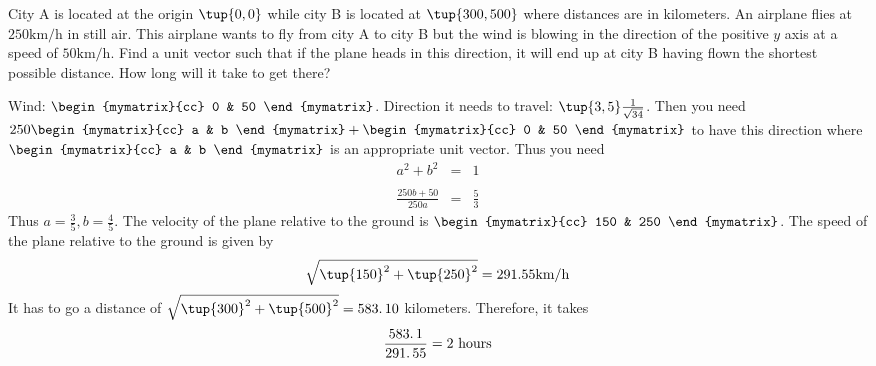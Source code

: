 \begin{enumialphparenastyle}
\begin{ex} 
City A is located at the origin $\tup{0,0 }$ while city B is located at $\tup{300,500 } $ where distances are in kilometers. An airplane flies at $250\textrm{km}/\textrm{h}$ in still air. This airplane wants to fly from city A to city
B but the wind is blowing in the direction of the positive $y$ axis at a
speed of $50\textrm{km}/\textrm{h}$. Find a unit vector such that if the plane heads
in this direction, it will end up at city B having flown the shortest
possible distance. How long will it take to get there? \vspace{1mm}
\begin{sol}
Wind: $\begin{mymatrix}{cc}
0 & 50
\end{mymatrix}$. Direction it needs to travel: $\tup{3,5 } \frac{1}{\sqrt{34}}$. Then you need $250 \begin{mymatrix}{cc}
 a & b
\end{mymatrix} + \begin{mymatrix}{cc}
0 & 50
\end{mymatrix} $ to
have this direction where $\begin{mymatrix}{cc}
 a & b
\end{mymatrix} $ is an appropriate unit
vector. Thus you need
\begin{eqnarray*}
a^{2}+b^{2} &=&1 \\ 
& & \\
\frac{250b+50}{250a} &=&\frac{5}{3}
\end{eqnarray*}
Thus $a=\frac{3}{5},b=\frac{4}{5}$. The velocity of the plane relative
to the ground is $\begin{mymatrix}{cc}
150 & 250
\end{mymatrix}$. The speed of the plane relative to the ground is given by 
\[
\sqrt{\tup{150} ^{2}+\tup{250} ^{2}}=
291.55 \textrm{km}/\textrm{h}
\]
It has to go a distance of $\sqrt{\tup{300} ^{2}+\tup{500}
^{2}}=\allowbreak 583.\,\allowbreak 10$ kilometers. Therefore, it takes
\[
\frac{\allowbreak 583.\,\allowbreak 1}{\allowbreak 291.\,\allowbreak 55}=2
\text{ hours}
\]
\end{sol}
\end{ex}


\end{enumialphparenastyle}
